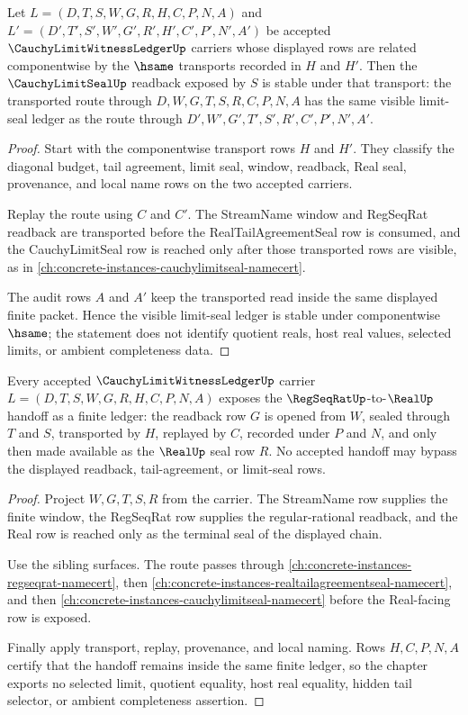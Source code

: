 \begin{theorem}
\label{thm:cauchy-limit-witness-ledger-limit-seal-stability}
Let $L=(D,T,S,W,G,R,H,C,P,N,A)$ and $L'=(D',T',S',W',G',R',H',C',P',N',A')$ be accepted $\CauchyLimitWitnessLedgerUp$ carriers whose displayed rows are related componentwise by the $\hsame$ transports recorded in $H$ and $H'$. Then the $\CauchyLimitSealUp$ readback exposed by $S$ is stable under that transport: the transported route through $D,W,G,T,S,R,C,P,N,A$ has the same visible limit-seal ledger as the route through $D',W',G',T',S',R',C',P',N',A'$.
\end{theorem}
\begin{proof}
Start with the componentwise transport rows $H$ and $H'$. They classify the diagonal budget, tail agreement, limit seal, window, readback, Real seal, provenance, and local name rows on the two accepted carriers.

Replay the route using $C$ and $C'$. The StreamName window and RegSeqRat readback are transported before the RealTailAgreementSeal row is consumed, and the CauchyLimitSeal row is reached only after those transported rows are visible, as in \autoref{ch:concrete-instances-cauchylimitseal-namecert}.

The audit rows $A$ and $A'$ keep the transported read inside the same displayed finite packet. Hence the visible limit-seal ledger is stable under componentwise $\hsame$; the statement does not identify quotient reals, host real values, selected limits, or ambient completeness data.
\end{proof}

\begin{theorem}
\label{thm:cauchy-limit-witness-ledger-regseqrat-real-handoff}
Every accepted $\CauchyLimitWitnessLedgerUp$ carrier $L=(D,T,S,W,G,R,H,C,P,N,A)$ exposes the $\RegSeqRatUp$-to-$\RealUp$ handoff as a finite ledger: the readback row $G$ is opened from $W$, sealed through $T$ and $S$, transported by $H$, replayed by $C$, recorded under $P$ and $N$, and only then made available as the $\RealUp$ seal row $R$. No accepted handoff may bypass the displayed readback, tail-agreement, or limit-seal rows.
\end{theorem}
\begin{proof}
Project $W,G,T,S,R$ from the carrier. The StreamName row supplies the finite window, the RegSeqRat row supplies the regular-rational readback, and the Real row is reached only as the terminal seal of the displayed chain.

Use the sibling surfaces. The route passes through \autoref{ch:concrete-instances-regseqrat-namecert}, then \autoref{ch:concrete-instances-realtailagreementseal-namecert}, and then \autoref{ch:concrete-instances-cauchylimitseal-namecert} before the Real-facing row is exposed.

Finally apply transport, replay, provenance, and local naming. Rows $H,C,P,N,A$ certify that the handoff remains inside the same finite ledger, so the chapter exports no selected limit, quotient equality, host real equality, hidden tail selector, or ambient completeness assertion.
\end{proof}

